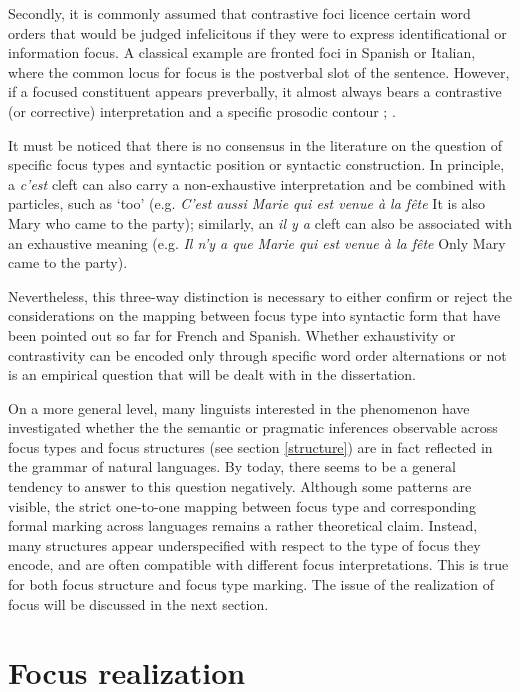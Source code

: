 \documentclass[12pt]{report}
\begin{document}
Secondly, it is commonly assumed that contrastive foci licence certain word orders that would be judged infelicitous if they were to express identificational or information focus. A classical example are fronted foci in Spanish or Italian, where the common locus for focus is the postverbal slot of the sentence. However, if a focused constituent appears preverbally, it almost always bears a contrastive (or corrective) interpretation and a specific prosodic contour \cite{brunetti2009italian}; \cite{bianchi2013focus}.

It must be noticed that there is no consensus in the literature on the question of specific focus types and syntactic position or syntactic construction. In principle, a \textit{c'est} cleft can also carry a non-exhaustive interpretation and be combined with particles, such as ‘too' (e.g. \textit{C'est aussi Marie qui est venue à la fête} It is also Mary who came to the party); similarly, an \textit{il y a} cleft can also be associated with an exhaustive meaning (e.g. \textit{Il n'y a que Marie qui est venue à la fête} Only Mary came to the party). 


Nevertheless, this three-way distinction is necessary to either confirm or reject the considerations on the mapping between focus type into syntactic form that have been pointed out so far for French and Spanish. Whether exhaustivity or contrastivity can be encoded only through specific word order alternations or not is an empirical question that will be dealt with in the dissertation. 


On a more general level, many linguists interested in the phenomenon  have investigated whether the the semantic or pragmatic inferences observable across focus types and focus structures (see section \ref{structure}) are in fact reflected in the grammar of natural languages.
By today, there seems to be a general tendency to answer to this question negatively. Although some patterns are visible, the strict one-to-one mapping between focus type and corresponding formal marking across languages remains a rather theoretical claim. Instead, many structures appear underspecified with respect to the type of focus they encode, and are often compatible with different focus interpretations. This is  true for both focus structure and focus type marking. The issue of the realization of focus will be discussed in the next section.\\


\section{Focus realization}\label{relization}
\end{document}
